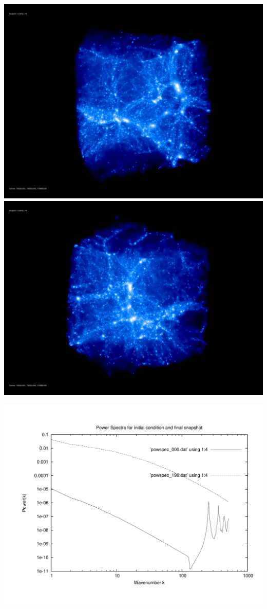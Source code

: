 \includegraphics[scale=0.1]{NGenIC_10629/rotate_00074.jpg} 
\includegraphics[scale=0.1]{NGenIC_10629/rotate_00131.jpg}

\includegraphics[scale=0.5]{NGenIC_10629/plot_powspec_NGenIC_10629}

